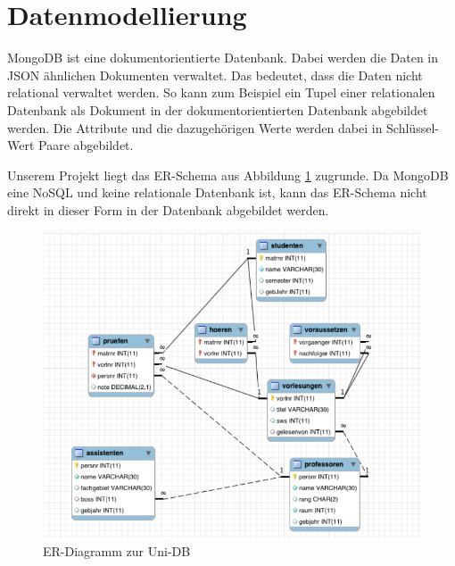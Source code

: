 \section{Datenmodellierung}
\label{kap:ERDiagramm}
MongoDB ist eine dokumentorientierte Datenbank. Dabei werden die Daten in JSON
ähnlichen Dokumenten verwaltet. Das bedeutet, dass die Daten nicht relational
verwaltet werden. So kann zum Beispiel ein Tupel einer relationalen Datenbank
als Dokument in der dokumentorientierten Datenbank abgebildet werden. Die
Attribute und die dazugehörigen Werte werden dabei in Schlüssel-Wert Paare
abgebildet. 

Unserem Projekt liegt das ER-Schema aus Abbildung \ref{fig:uni-db}
zugrunde.
Da MongoDB eine NoSQL und keine relationale Datenbank ist, kann das ER-Schema nicht direkt
in dieser Form in der Datenbank abgebildet werden. 

\begin{figure}[h] 
	\centering
		\includegraphics[width=1\textwidth]{./pictures/SQL-DB_ER_Diagramm_UNI-DB.png}
	\caption{ER-Diagramm zur Uni-DB \cite{Kaufmann2016}}
	\label{fig:uni-db}
\end{figure}

